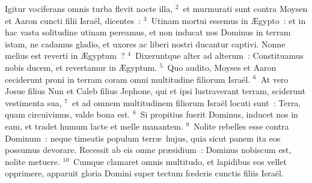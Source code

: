 \lettrine[lines=3,image=true,loversize=0.05,lraise=-0.03]{I}{}gitur vociferans omnis turba flevit nocte illa,
${}^{2}$~et murmurati sunt contra Moysen et Aaron cuncti filii Isra\"el, dicentes~:
${}^{3}$~Utinam mortui essemus in \AE gypto~: et in hac vasta solitudine utinam pereamus, et non inducat nos Dominus in terram istam, ne cadamus gladio, et uxores ac liberi nostri ducantur captivi. Nonne melius est reverti in \AE gyptum~?
${}^{4}$~Dixeruntque alter ad alterum~: Constituamus nobis ducem, et revertamur in \AE gyptum.
${}^{5}$~Quo audito, Moyses et Aaron ceciderunt proni in terram coram omni multitudine filiorum Isra\"el.
${}^{6}$~At vero Josue filius Nun et Caleb filius Jephone, qui et ipsi lustraverant terram, sciderunt vestimenta sua,
${}^{7}$~et ad omnem multitudinem filiorum Isra\"el locuti sunt~: Terra, quam circuivimus, valde bona est.
${}^{8}$~Si propitius fuerit Dominus, inducet nos in eam, et tradet humum lacte et melle manantem.
${}^{9}$~Nolite rebelles esse contra Dominum~: neque timeatis populum terr\ae\ hujus, quia sicut panem ita eos possumus devorare. Recessit ab eis omne pr\ae sidium~: Dominus nobiscum est, nolite metuere.
${}^{10}$~Cumque clamaret omnis multitudo, et lapidibus eos vellet opprimere, apparuit gloria Domini super tectum fœderis cunctis filiis Isra\"el.


